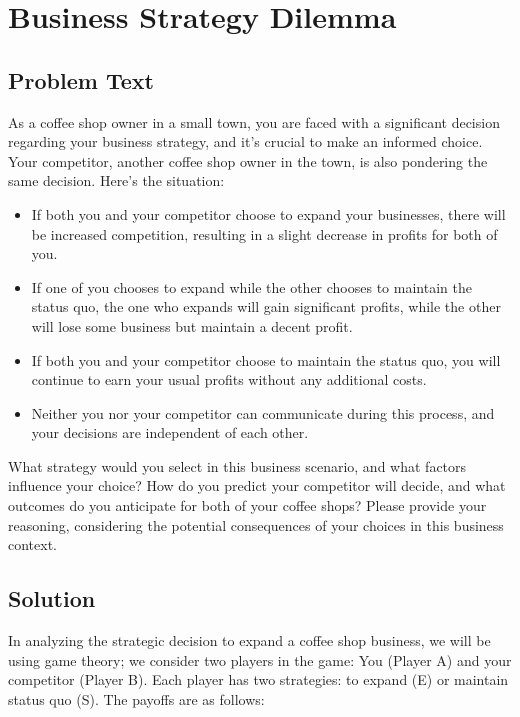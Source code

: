 \documentclass[a4paper, 10pt]{article}
\begin{document}
    \section{Business Strategy Dilemma}
        \subsection{Problem Text}
            \noindent As a coffee shop owner in a small town, you are faced with a significant decision regarding your business strategy, and it’s crucial to make an informed choice. Your competitor, another coffee shop owner in the town, is also pondering the same decision. Here’s the situation:

            \begin{itemize}
                \item If both you and your competitor choose to expand your businesses, there will be increased competition, resulting in a slight decrease in profits for both of you.
                \item If one of you chooses to expand while the other chooses to maintain the status quo, the one who expands will gain significant profits, while the other will lose some business but maintain a decent profit.
                \item If both you and your competitor choose to maintain the status quo, you will continue to earn your usual profits without any additional costs.
                \item Neither you nor your competitor can communicate during this process, and your decisions are independent of each other.
            \end{itemize}

            \noindent What strategy would you select in this business scenario, and what factors influence your choice? How do you predict your competitor will decide, and what outcomes do you anticipate for both of your coffee shops? Please provide your reasoning, considering the potential consequences of your choices in this business context.
    
        \subsection{Solution}
            In analyzing the strategic decision to expand a coffee shop business, we will be using game theory; we consider two players in the game: You (Player A) and your competitor (Player B). Each player has two strategies: to expand (E) or maintain status quo (S). The payoffs are as follows:
\end{document}
